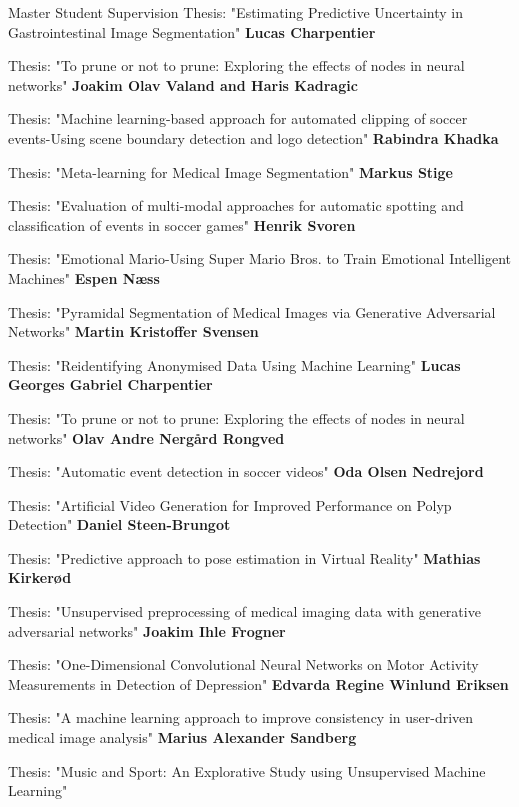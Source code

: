 \begin{rubric}{Master Student Supervision}
    Thesis: "Estimating Predictive Uncertainty in Gastrointestinal Image Segmentation"
    \entry*[2021]%
    \textbf{Lucas Charpentier} \par
    Thesis: "To prune or not to prune: Exploring the effects of nodes in neural networks"
    \entry*[2021]%
    \textbf{Joakim Olav Valand and Haris Kadragic} \par
    Thesis: "Machine learning-based approach for automated clipping of soccer events-Using scene boundary detection and logo detection"
    \entry*[2021]%
    \textbf{Rabindra Khadka} \par
    Thesis: "Meta-learning for Medical Image Segmentation"
    \entry*[2021]%
    \textbf{Markus Stige} \par
    Thesis: "Evaluation of multi-modal approaches for automatic spotting and classification of events in soccer games"
    \entry*[2020]%
    \textbf{Henrik Svoren} \par
    Thesis: "Emotional Mario-Using Super Mario Bros. to Train Emotional Intelligent Machines"
    \entry*[2020]%
    \textbf{Espen Næss} \par
    Thesis: "Pyramidal Segmentation of Medical Images via Generative Adversarial Networks"
    \entry*[2020]%
    \textbf{Martin Kristoffer Svensen} \par
    Thesis: "Reidentifying Anonymised Data Using Machine Learning"
    \entry*[2020]%
    \textbf{Lucas Georges Gabriel Charpentier} \par
    Thesis: "To prune or not to prune: Exploring the effects of nodes in neural networks"
    \entry*[2020]%
    \textbf{Olav Andre Nergård Rongved} \par
    Thesis: "Automatic event detection in soccer videos"
    \entry*[2020]%
    \textbf{Oda Olsen Nedrejord} \par
    Thesis: "Artificial Video Generation for Improved Performance on Polyp Detection"
    \entry*[2020]%
    \textbf{Daniel Steen-Brungot} \par
    Thesis: "Predictive approach to pose estimation in Virtual Reality"
    \entry*[2019]%
    \textbf{Mathias Kirkerød} \par
    Thesis: "Unsupervised preprocessing of medical imaging data with generative adversarial networks"
    \entry*[2019]%
    \textbf{Joakim Ihle Frogner} \par
    Thesis: "One-Dimensional Convolutional Neural Networks on Motor Activity Measurements in Detection of Depression"
    \entry*[2019]%
    \textbf{Edvarda Regine Winlund Eriksen} \par
    Thesis: "A machine learning approach to improve consistency in user-driven medical image analysis"
    \entry*[2019]%
    \textbf{Marius Alexander Sandberg} \par
    Thesis: "Music and Sport: An Explorative Study using Unsupervised Machine Learning"
\end{rubric}